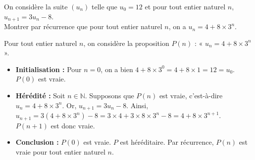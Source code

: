 \documentclass[11pt,fleqn]{book} %
\begin{document}
\begin{exercise}
On considère la suite $(u_n)$ telle que $u_0=12$ et pour tout entier naturel $n$, $u_{n+1}=3u_n-8$.\\ Montrer par récurrence que pour tout entier naturel $n$, on a  $u_n=4+8\times 3^n$.\end{exercise}
\begin{solution}Pour tout entier naturel $n$, on considère la proposition $P(n)$ : « $u_n=4+8\times 3^n$ ».
\begin{itemize}
\item \textbf{Initialisation :} Pour $n=0$, on a bien $4+8\times 3^0=4+8\times 1 = 12 = u_0$. $P(0)$ est vraie.
\item \textbf{Hérédité :} Soit $n\in\mathbb{N}$. Supposons que $P(n)$ est vraie, c'est-à-dire $u_n=4+8\times 3^n$. Or, $u_{n+1}=3u_n-8$. Ainsi, $u_{n+1}=3(4+8\times3^n)-8=3\times 4 +3\times 8 \times 3^n - 8 = 4 + 8 \times 3^{n+1}$. $P(n+1)$ est donc vraie.
\item \textbf{Conclusion :} $P(0)$ est vraie. $P$ est héréditaire. Par récurrence, $P(n)$ est vraie pour tout entier naturel $n$.
\end{itemize}\end{solution}
\end{document}
